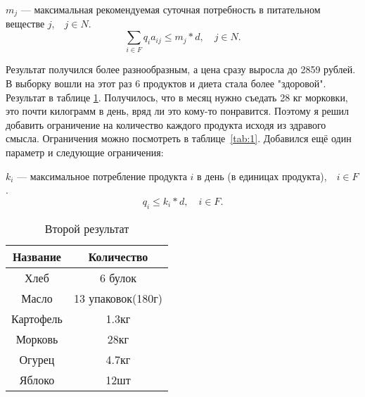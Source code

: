 \documentclass[]{article}
\begin{document}
\par\noindent
$m_j$ --- максимальная рекомендуемая суточная потребность в питательном веществе $j$,$\quad j\in N$.
\begin{equation}
	\sum_{i\in F}q_ia_{ij} \leq m_j*d,\quad j\in N.
\end{equation}

Результат получился более разнообразным, а цена сразу выросла до 2859 рублей. В
выборку вошли на этот раз 6 продуктов и диета стала более "здоровой". Результат
в таблице \ref{tab:3}.
Получилось, что в месяц нужно съедать 28 кг морковки, это почти килограмм в день,
вряд ли это кому-то понравится. Поэтому я решил добавить ограничение на количество
каждого продукта исходя из здравого смысла. Ограничения можно посмотреть в таблице~\ref{tab:1}.
Добавился ещё один параметр и следующие ограничения:
\par\noindent
$k_i$ --- максимальное потребление продукта $i$ в день (в единицах продукта),$\quad i\in F$.
\begin{equation}
	q_i \leq k_i*d,\quad i\in F.
\end{equation}
\begin{table}
	\caption{Второй результат}
	\centering
	\label{tab:3}
	\begin{tabular}{|c|c|}
		\hline
		Название&Количество\\
		\hline
		Хлеб & 6 булок\\
		\hline
		Масло & 13 упаковок(180г)\\
		\hline
		Картофель & 1.3кг\\
		\hline
		Морковь & 28кг\\
		\hline
		Огурец & 4.7кг\\
		\hline
		Яблоко & 12шт\\
		\hline

	\end{tabular}

\end{table}
\end{document}
